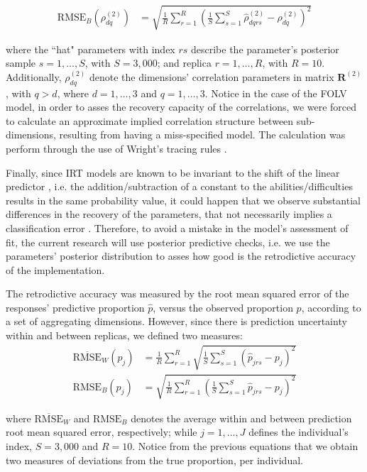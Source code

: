 %
\begin{align}
	\text{RMSE}_{B} \left( \rho^{(2)}_{dq} \right) &=\sqrt{\frac{1}{R} \sum_{r=1}^{R} \left( \frac{1}{S} \sum_{s=1}^{S} \hat{\rho}^{(2)}_{dqrs} - \rho^{(2)}_{dq} \right)^2}
\end{align}

\noindent where the ``hat" parameters with index $rs$ describe the parameter's posterior sample $s=1, \dots, S$, with $S=3,000$; and replica $r=1, \dots, R$, with $R=10$. Additionally, $\rho^{(2)}_{dq}$ denote the dimensions' correlation parameters in matrix $\boldsymbol{R}^{(2)}$, with $q>d$, where $d=1,\dots,3$ and $q=1,\dots,3$. Notice in the case of the FOLV model, in order to asses the recovery capacity of the correlations, we were forced to calculate an approximate implied correlation structure between sub-dimensions, resulting from having a miss-specified model. The calculation was perform through the use of Wright's tracing rules \cite{Beaujean_2014}.

Finally, since IRT models are known to be invariant to the shift of the linear predictor \cite{Baker_et_al_1992, Bock_1972}, i.e. the addition/subtraction of a constant to the abilities/difficulties results in the same probability value, it could happen that we observe substantial differences in the recovery of the parameters, that not necessarily implies a classification error  \cite{Wollack_2002}. Therefore, to avoid a mistake in the model's assessment of fit, the current research will use posterior predictive checks, i.e. we use the parameters' posterior distribution to asses how good is the retrodictive accuracy of the implementation.

The retrodictive accuracy was measured by the root mean squared error of the responses' predictive proportion $\hat{p}$, versus the observed proportion $p$, according to a set of aggregating dimensions. However, since there is prediction uncertainty within and between replicas, we defined two measures:
%
\begin{align}
	\overline{\text{RMSE}}_{W} \left( p_{j} \right) &= \frac{1}{R} \sum_{r=1}^{R} \sqrt{ \frac{1}{S} \sum_{s=1}^{S} \left( \hat{p}_{jrs} - p_{j} \right)^2} \\
	\text{RMSE}_{B} \left( p_{j} \right) &= \sqrt{ \frac{1}{R} \sum_{r=1}^{R}  \left( \frac{1}{S} \sum_{s=1}^{S} \hat{p}_{jrs} - p_{j} \right)^2} 
\end{align}

\noindent where $\overline{\text{RMSE}}_{W}$ and $\text{RMSE}_{B}$ denotes the average within and between prediction root mean squared error, respectively; while $j=1,\dots,J$ defines the individual's index, $S=3,000$ and $R=10$. Notice from the previous equations that we obtain two measures of deviations from the true proportion, per individual.

